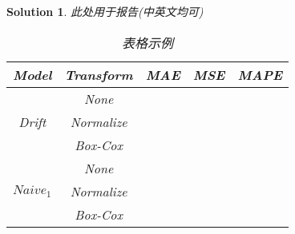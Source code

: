 \documentclass[a4paper,UTF8]{article}
\numberwithin{equation}{section}
\newtheorem*{mySol}{Solution}
\begin{document}
	\begin{mySol}
		此处用于报告(中英文均可)
		\begin{table}[]
			\centering
			\caption{表格示例}
			\begin{tabular}{ccccc}
				\toprule
				Model                      & Transform & MAE & MSE & MAPE \\
				\midrule
				\multirow{3}{*}{Drift}     & None      &     &     &      \\
				& Normalize &     &     &      \\
				& Box-Cox   &     &     &      \\
				\midrule
				\multirow{3}{*}{$Naive_1$} & None      &     &     &      \\
				& Normalize &     &     &      \\
				& Box-Cox   &     &     &    \\
				\bottomrule
			\end{tabular}
			\label{tb:example}
		\end{table}


\end{mySol}
\end{document}
